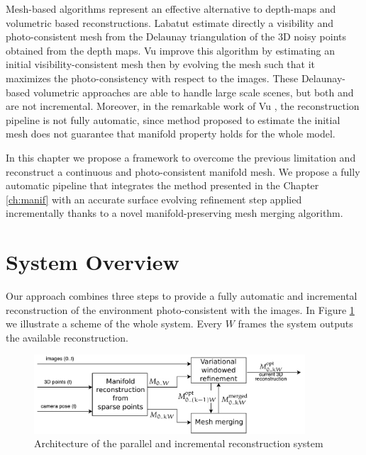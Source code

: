 Mesh-based algorithms represent an effective alternative to depth-maps and volumetric based reconstructions. Labatut \etal \cite{labatut2007efficient} estimate directly a visibility and photo-consistent mesh from the Delaunay triangulation of the 3D noisy points obtained from the depth maps.
Vu \etal  \cite{vu_et_al_2012} improve this algorithm by estimating an initial visibility-consistent mesh then by evolving the mesh such that it maximizes the photo-consistency with respect to the images. 
These Delaunay-based volumetric approaches are able to handle large scale scenes, but both \cite{labatut2007efficient} and \cite{vu_et_al_2012}  are not incremental.
Moreover, in the remarkable work of Vu \etal \cite{vu_et_al_2012}, the reconstruction pipeline   is not fully automatic, since  method proposed to estimate the initial mesh does not guarantee that manifold property holds for the whole model.



In this chapter we propose a framework to overcome the previous limitation and reconstruct a continuous and photo-consistent manifold mesh. 
We propose a fully automatic pipeline that integrates the method presented in the Chapter \ref{ch:manif}  with an accurate surface evolving refinement step applied incrementally thanks to a novel manifold-preserving mesh merging algorithm.


\section{System Overview}
 Our approach combines three steps  to provide a fully automatic and incremental reconstruction of the environment photo-consistent with the images. In Figure \ref{fig:architecture} we illustrate a scheme of the whole system. Every  $W$ frames the system outputs the available reconstruction.
 
 \begin{figure}[t]
  \centering
  \includegraphics[width=0.9\textwidth]{./img/ch-incr-dens/incremental-mvs-architectureOK}
  \caption{Architecture of the parallel and incremental reconstruction system}
  \label{fig:architecture}
\end{figure}


